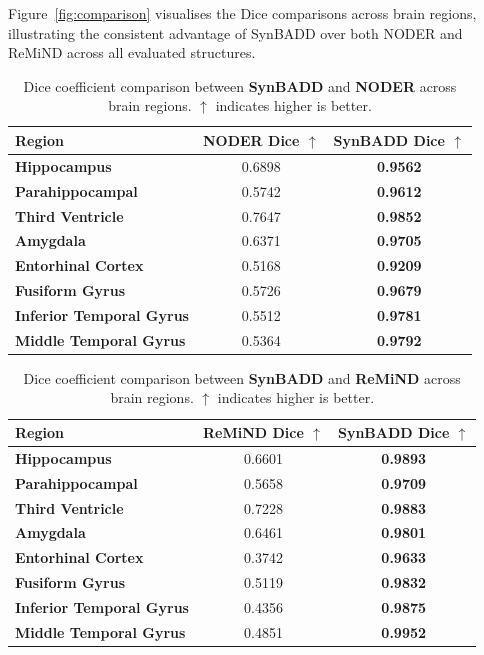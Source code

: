 Figure~\ref{fig:comparison} visualises the Dice comparisons across brain regions, illustrating the consistent advantage of SynBADD over both NODER and ReMiND across all evaluated structures.


\begin{table}[ht]
\centering
\caption{Dice coefficient comparison between \textbf{SynBADD} and \textbf{NODER} across brain regions. $\uparrow$ indicates higher is better.}
\begin{tabular}{>{\bfseries}lcc}
\toprule
Region & NODER Dice $\uparrow$ & SynBADD Dice $\uparrow$ \\
\midrule
Hippocampus             & 0.6898 & \textbf{0.9562} \\
Parahippocampal         & 0.5742 & \textbf{0.9612} \\
Third Ventricle         & 0.7647 & \textbf{0.9852} \\
Amygdala                & 0.6371 & \textbf{0.9705} \\
Entorhinal Cortex       & 0.5168 & \textbf{0.9209} \\
Fusiform Gyrus          & 0.5726 & \textbf{0.9679} \\
Inferior Temporal Gyrus & 0.5512 & \textbf{0.9781} \\
Middle Temporal Gyrus   & 0.5364 & \textbf{0.9792} \\
\bottomrule
\end{tabular}
\label{tab:dice_noder}
\end{table}

\begin{table}[ht]
\centering
\caption{Dice coefficient comparison between \textbf{SynBADD} and \textbf{ReMiND} across brain regions. $\uparrow$ indicates higher is better.}
\begin{tabular}{>{\bfseries}lcc}
\toprule
Region & ReMiND Dice $\uparrow$ & SynBADD Dice $\uparrow$ \\
\midrule
Hippocampus             & 0.6601 & \textbf{0.9893} \\
Parahippocampal         & 0.5658 & \textbf{0.9709} \\
Third Ventricle         & 0.7228 & \textbf{0.9883} \\
Amygdala                & 0.6461 & \textbf{0.9801} \\
Entorhinal Cortex       & 0.3742 & \textbf{0.9633} \\
Fusiform Gyrus          & 0.5119 & \textbf{0.9832} \\
Inferior Temporal Gyrus & 0.4356 & \textbf{0.9875} \\
Middle Temporal Gyrus   & 0.4851 & \textbf{0.9952} \\
\bottomrule
\end{tabular}
\label{tab:dice_remind}
\end{table}

